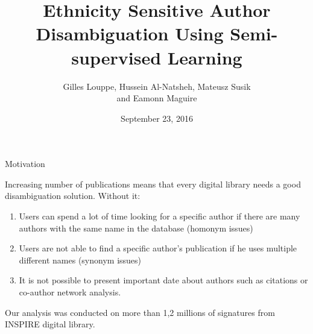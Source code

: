 \documentclass{beamer}
\title{\bf Ethnicity Sensitive Author Disambiguation Using Semi-supervised Learning}
\author{Gilles Louppe, Hussein Al-Natsheh, Mateusz Susik \\and 
Eamonn Maguire}
\institute{International Conference on Knowledge Engineering and Semantic Web 2016, Prague}
\date{September 23, 2016}
\begin{document}
\begin{frame}
\titlepage
\end{frame}



\begin{frame}{Motivation}

Increasing number of publications means that every digital library needs a good
disambiguation solution. Without it:

\begin{enumerate}
    \item Users can spend a lot of time looking for a specific author if there are
    many authors with the same name in the database (homonym issues)
    \item Users are not able to find a specific author's publication if he uses
    multiple different names (synonym issues)
    \item It is not possible to present important date about authors such as citations
    or co-author network analysis.
\end{enumerate}

Our analysis was conducted on more than 1,2 millions of signatures from INSPIRE digital
library.


\end{frame}


\end{document}
